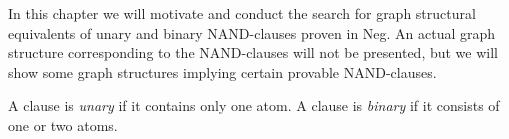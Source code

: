 In this chapter we will motivate and conduct the search for graph structural equivalents of unary and binary NAND-clauses proven in Neg.
An actual graph structure corresponding to the NAND-clauses will not be presented, but we will show some graph structures implying certain provable NAND-clauses.
\begin{definition}
  A clause is \textit{unary} if it contains only one atom.
  A clause is \textit{binary} if it consists of one or two atoms.
\end{definition}
